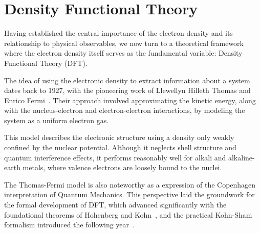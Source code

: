 \section{Density Functional Theory}

Having established the central importance of the electron density and its
relationship to physical observables, we now turn to a theoretical framework
where the electron density itself serves as the fundamental variable: Density
Functional Theory (DFT).

The idea of using the electronic density to extract information about a system
dates back to 1927, with the pioneering work of Llewellyn Hilleth Thomas and
Enrico Fermi~\cite{Thomas1927,fermi1927statistical}. Their approach involved
approximating the kinetic energy, along with the nucleus-electron and
electron-electron interactions, by modeling the system as a uniform electron
gas.


This model describes the electronic structure using a density only weakly
confined by the nuclear potential. Although it neglects shell structure and
quantum interference effects, it performs reasonably well for alkali and
alkaline-earth metals, where valence electrons are loosely bound to the nuclei.

The Thomas-Fermi model is also noteworthy as a expression of the Copenhagen
interpretation of Quantum Mechanics.  This perspective laid the groundwork for
the formal development of \gls{DFT}, which advanced significantly with the
foundational theorems of Hohenberg and Kohn~\cite{Hohenberg1964}, and the
practical Kohn-Sham formalism introduced the following year~\cite{Kohn1965}.

